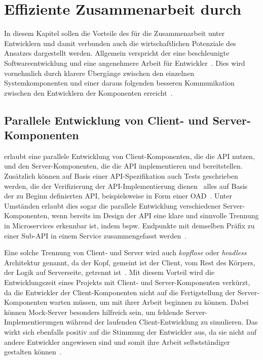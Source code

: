\chapter{Effiziente Zusammenarbeit durch \AF}
In diesem Kapitel sollen die Vorteile des \AFAes für die Zusammenarbeit unter Entwicklern und damit verbunden auch die wirtschaftlichen Potenziale des Ansatzes dargestellt werden.
Allgemein verspricht der \AFA eine beschleunigte Softwareentwicklung und eine angenehmere Arbeit für Entwickler~\cite[354\psq]{de23}.
Dies wird vornehmlich durch klarere Übergänge zwischen den einzelnen Systemkomponenten und einer daraus folgenden besseren Kommunikation zwischen den Entwicklern der Komponenten erreicht~\cite[75]{bea22}.

\section{Parallele Entwicklung von Client- und Server-Komponenten}
\AF erlaubt eine parallele Entwicklung von Client-Komponenten, die die \ac{API} nutzen, und den Server-Komponenten, die die \ac{API} implementieren und bereitstellen.
Zusätzlich können auf Basis einer \ac{API}-Spezifikation auch Tests geschrieben werden, die der Verifizierung der \ac{API}-Implementierung dienen \textendash\ alles auf Basis der zu Beginn definierten \ac{API}, beispielsweise in Form einer \ac{OAD}~\cite{vol22}.
Unter Umständen erlaubt dies sogar die parallele Entwicklung verschiedener Server-Komponenten, wenn bereits im Design der \ac{API} eine klare und sinnvolle Trennung in Microservices erkennbar ist, indem bspw. Endpunkte mit demselben Präfix zu einer Sub-\ac{API} in einem Service zusammengefasst werden~\cite[354]{de23}.

Eine solche Trennung von Client- und Server wird auch \emph{kopflose} oder \emph{headless} Architektur genannt, da der Kopf, gemeint ist der Client, vom Rest des Körpers, der Logik auf Serverseite, getrennt ist~\cite[5]{kul23}.
Mit diesem Vorteil wird die Entwicklungszeit eines Projekts mit Client- und Server-Komponenten verkürzt, da die Entwickler der Client-Komponenten nicht auf die Fertigstellung der Server-Komponenten warten müssen, um mit ihrer Arbeit beginnen zu können.
Dabei können Mock-Server besonders hilfreich sein, um fehlende Server-Implementierungen während der laufenden Client-Entwicklung zu simulieren.
Das wirkt sich ebenfalls positiv auf die Stimmung der Entwickler aus, da sie nicht auf andere Entwickler angewiesen sind und somit ihre Arbeit selbstständiger gestalten können~\cite[351]{de23}.

